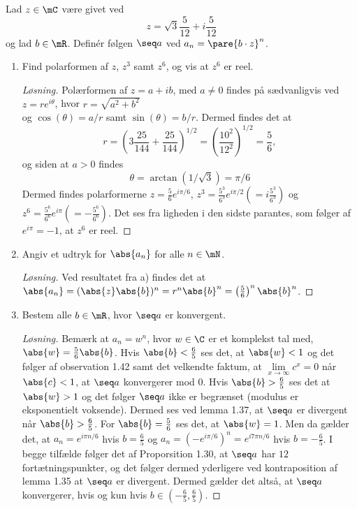 \setcounter{section}{1}
\newif\ifanswers
\answerstrue %


\begin{opg}
Lad $z\in\mC$ være givet ved
$$ z = \sqrt{3}\frac{5}{12}+i\frac{5}{12} $$
og lad $b\in\mR$. Definér følgen $\seq a$ ved $a_n = \pare{b\cdot z}^n$.
\begin{enumerate}
    \item Find polarformen af $z$, $z^3$ samt $z^6$, og vis at $ z^6 $ er reel. 
    \ifanswers \begin{proof}[Løsning]
    	Polærformen af $ z=a+ib $, med $ a\neq0 $ findes på sædvanligvis ved $ z=re^{i\theta} $, hvor $ r=\sqrt{a^2+b^2} $\\ og $ \cos(\theta)=a/r $ samt $ \sin(\theta)=b/r $. Dermed findes det at \begin{equation*}
    		r=\left(3\frac{25}{144}+\frac{25}{144}\right)^{1/2}=\left(\frac{10^2}{12^2}\right)^{1/2}=\frac{5}{6},
    	\end{equation*}
    	og siden at $ a>0 $ findes \begin{equation*}
    	\theta=\arctan(1/\sqrt{3})=\pi/6
    	\end{equation*}
    	Dermed findes polarformerne $ z=\frac{5}{6}e^{i\pi/6} $, $ z^3=\frac{5^3}{6^3}e^{i\pi/2}(=i\frac{5^3}{6^3}) $ og $ z^6=\frac{5^6}{6^6}e^{i\pi}(=-\frac{5^6}{6^6}) $. Det ses fra ligheden i den sidste parantes, som følger af $ e^{i\pi}=-1 $, at $ z^6 $ er reel.
    \end{proof} \fi
    
    
    \item Angiv et udtryk for $\abs{a_n}$ for alle $n\in\mN$.
    \ifanswers \begin{proof}[Løsning]
    	Ved resultatet fra a) findes det at $ \abs{a_n}=(\abs{z}\abs{b})^n=r^n\abs{b}^n=\left(\frac{5}{6}\right)^n\abs{b}^n $.
    \end{proof} \fi

    
    
    \item Bestem alle $b\in\mR$, hvor $\seq a$ er konvergent.
    \ifanswers \begin{proof}[Løsning]
    	Bemærk at $ a_n=w^n $, hvor $ w\in\C $ er et komplekst tal med, $ \abs{w}=\frac{5}{6}\abs{b} $. Hvis $ \abs{b}<\frac{6}{5} $ ses det, at $ \abs{w}<1 $ og det følger af observation 1.42 samt det velkendte faktum, at $ \lim\limits_{x\to\infty}c^x=0 $ når $ \abs{c}<1 $, at $ \seq a $ konvergerer mod 0. Hvis $ \abs{b}>\frac{6}{5} $ ses det at $ \abs{w}>1 $ og det følger $ \seq a $ ikke er begrænset (modulus er eksponentielt voksende). Dermed ses ved lemma 1.37, at $ \seq a $ er divergent når $ \abs{b}>\frac{6}{5} $. For $ \abs{b}=\frac{5}{6} $ ses det, at $ \abs{w}=1 $. Men da gælder det, at $ a_n=e^{i\pi n/6} $ hvis $ b=\frac{6}{5} $ og $ a_n=(-e^{i\pi/6})^n=e^{i7\pi n/6} $ hvis $ b=-\frac{6}{5} $. I begge tilfælde følger det af Proporsition 1.30, at $ \seq a $ har $ 12 $ fortætningspunkter, og det følger dermed yderligere ved kontraposition af lemma 1.35 at $ \seq a $ er divergent. Dermed gælder det altså, at $ \seq a $ konvergerer, hvis og kun hvis $ b\in\left(-\frac{6}{5},\frac{6}{5}\right) $.
    \end{proof} \fi
    

\end{enumerate}
\end{opg}
